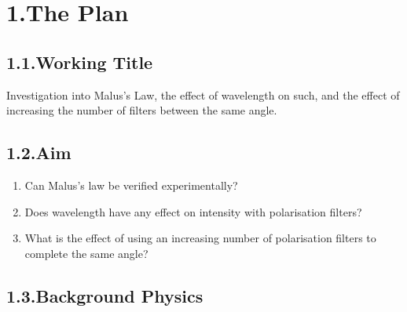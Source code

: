 \documentclass{article}
\begin{document}
\mdxtitleblockstart{}
\mdxauthorstart{}
\mdxauthorend\mdtitleauthorrunning{}{}\mdxtitleblockend%

\section{1.\hspace*{0.5em}The Plan}\label{sec-the-plan}%

\subsection{1.1.\hspace*{0.5em}Working Title}\label{sec-working-title}%

\noindent{}Investigation into Malus's Law, the effect of wavelength on such, and the effect of increasing the number of filters between the same angle.%

\subsection{1.2.\hspace*{0.5em}Aim}\label{sec-aim}%

\begin{enumerate}[noitemsep,topsep=\mdcompacttopsep]%

\item{}Can Malus’s law be verified experimentally?%

\item{}Does wavelength have any effect on intensity with polarisation filters?%

\item{}What is the effect of using an increasing number of polarisation filters to complete the same angle?%
\end{enumerate}%

\subsection{1.3.\hspace*{0.5em}Background Physics}\label{sec-background-physics}%
\end{document}
